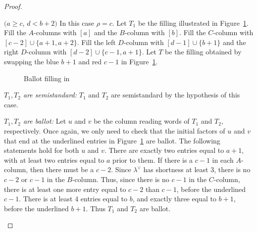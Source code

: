 \begin{proof}
\begin{Case}
\end{Case}

\begin{Case}
{ $(a\geq c$, $d< b+2)$} 
In this case $\rho = c$. Let $T_1$ be the filling illustrated in Figure~\ref{Case3b'}. Fill the $A$-columns with $[a]$ and the $B$-column with $[b]$. Fill the $C$-column with $[ c-2]\cup \{a+1, a+2\}$. Fill the left $D$-column with $[d-1]\cup \{ b+1\}$ and the right $D$-column with $[d-2]\cup\{ c-1, a+1\}$. Let $T$ be the filling obtained by swapping the blue $b+1$ and red $c-1$ in Figure~\ref{Case3b'}.


\begin{figure}[htb]\centering
 \caption[Ballot filling in Case 3.2.1]{Ballot filling in }
 \label{Case3b'}
\end{figure}


\emph{$T_1,T_2$ are semistandard:} $T_1$ and $T_2$ are semistandard by the hypothesis of this case.

\emph{$T_1,T_2$ are ballot:} Let $u$ and $v$ be the column reading words of $T_1$ and $T_2$, respectively. Once again, we only need to check that the initial factors of $u$ and $v$ that end at the underlined entries in Figure~\ref{Case3b'} are ballot. The following statements hold for both $u$ and $v$. There are exactly two entries equal to $a+1$, with at least two entries equal to $a$ prior to them. If there is a $c-1$ in each $A$-column, then there must be a $c-2$. Since $\lambda^{\vee}$ has shortness at least 3, there is no $c-2$ or $c-1$ in the $B$-column. Thus, since there is no $c-1$ in the $C$-column, there is at least one more entry equal to $c-2$ than $c-1$, before the underlined $c-1$. There is at least 4 entries equal to $b$, and exactly three equal to $b+1$, before the underlined $b+1$. Thus $T_1$ and $T_2$ are ballot.


\end{Case}
\end{proof}
